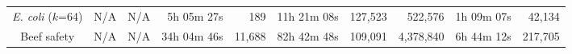 \begin{sidewaystable}
\begin{tabular}{|c|r|r|r|r|r|r|r|r|r|}

    \emph{E. coli} ($k$=64)         & N/A & N/A & 5h 05m 27s & 189 & 11h 21m 08s & 127,523 & 522,576 & 1h 09m 07s & 42,134 \\

    Beef safety & N/A & N/A & 34h 04m 46s & 11,688 & 82h 42m 48s & 109,091 & 4,378,840 & 6h 44m 12s & 217,705 \\


\end{tabular}
\end{sidewaystable}

